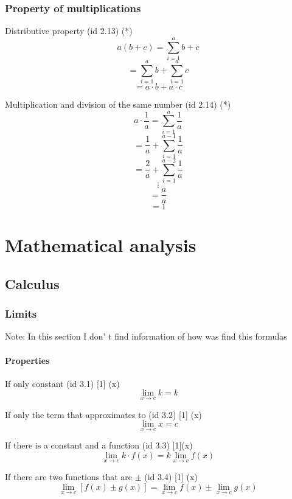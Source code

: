 \documentclass{book}
\begin{document}
            \subsection{Property of multiplications}
                Distributive property (id 2.13) (*)
                    \[a(b + c) = \sum^a_{i=1} b + c\]
                    \[= \sum^a_{i=1} b + \sum^a_{i=1} c\]
                    \[= a \cdot b + a \cdot c\]

                Multiplication and division of the same number (id 2.14) (*)
                    \[a \cdot \frac{1}{a} = \sum^a_{i=1} \frac{1}{a}\]
                    \[= \frac{1}{a} + \sum^{a - 1}_{i=1} \frac{1}{a}\]
                    \[= \frac{2}{a} + \sum^{a - 2}_{i=1} \frac{1}{a}\]
                    \[\vdots\]
                    \[= \frac{a}{a}\]
                    \[= 1\]
    
    \chapter{Mathematical analysis}                    
        \section{Calculus}
            \subsection{Limits}
                Note: In this section I don' t find information of how was find this formulas
            
                \subsubsection{Properties}
                    If only constant (id 3.1) [1] (x)
                    \[\lim_{x \rightarrow c} k = k\]
    
                    If only the term that approximates to (id 3.2) [1] (x)
                    \[\lim_{x \rightarrow c} x = c\]
    
                    If there is a constant and a function (id 3.3) [1](x)
                    \[\lim_{x \rightarrow c} k \cdot f(x) = k \lim_{x \rightarrow c} f(x)\]
    
                    If there are two functions that are $\pm$ (id 3.4) [1] (x)
                    \[\lim_{x \rightarrow c} [f(x) \pm g(x)] = \lim_{x \rightarrow c} f(x) \pm \lim_{x \rightarrow c} g(x)\]
    
\end{document}
